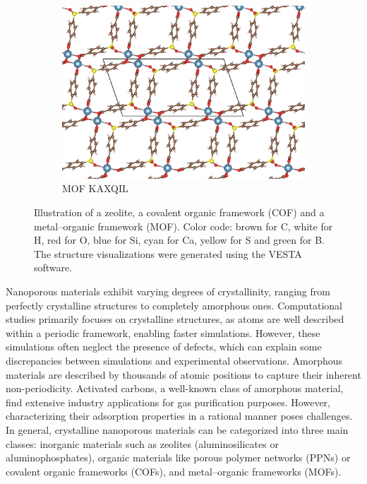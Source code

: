 \documentclass[main.tex]{subfiles}
\begin{document}
\begin{figure}[ht]
\begin{subfigure}[b]{0.32\textwidth}
    \includegraphics[height=0.7\textwidth]{figures/1-screening/SBMOF-1.jpg}
    \caption{MOF KAXQIL~\cite{KAXQIL}}
  \end{subfigure}
  \caption{Illustration of a zeolite, a covalent organic framework (COF) and a metal--organic framework (MOF). Color code: brown for C, white for H, red for O, blue for Si, cyan for Ca, yellow for S and green for B. The structure visualizations were generated using the VESTA software.\autocite{VESTA}}
\end{figure}

Nanoporous materials exhibit varying degrees of crystallinity, ranging from perfectly crystalline structures to completely amorphous ones. Computational studies primarily focuses on crystalline structures, as atoms are well described within a periodic framework, enabling faster simulations. However, these simulations often neglect the presence of defects, which can explain some discrepancies between simulations and experimental observations. Amorphous materials are described by thousands of atomic positions to capture their inherent non-periodicity.\autocite{Thyagarajan_2020} Activated carbons, a well-known class of amorphous material, find extensive industry applications for gas purification purposes. However, characterizing their adsorption properties in a rational manner poses challenges. In general, crystalline nanoporous materials can be categorized into three main classes: inorganic materials such as zeolites (aluminosilicates or aluminophosphates), organic materials like porous polymer networks (PPNs) or covalent organic frameworks (COFs), and metal--organic frameworks (MOFs).
\end{document}
